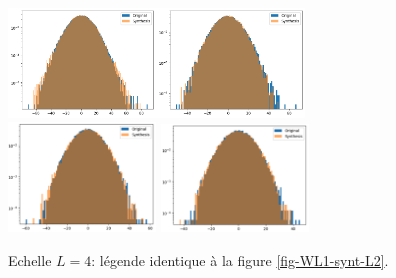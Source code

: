 \documentclass[12pt,twoside]{article}
\begin{document}
\begin{figure}
\centering
\includegraphics[width=0.35\textwidth]{fig-WL1-synt-L4-pixelval.png}\includegraphics[width=0.35\textwidth]{fig-WL1-synt-L4-details_1.png}\\
\includegraphics[width=0.35\textwidth]{fig-WL1-synt-L4-details_2.png}
\includegraphics[width=0.35\textwidth]{fig-WL1-synt-L4-details_3.png}
\caption{Echelle $L=4$: légende identique à la figure \ref{fig-WL1-synt-L2}.}
\label{fig-WL1-synt-L4}
\end{figure}
\end{document}
